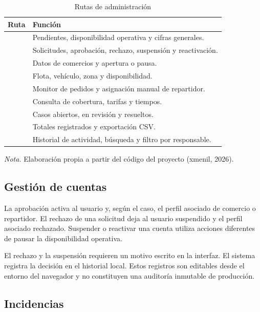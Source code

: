 \documentclass[12pt,letterpaper]{article}
\begin{document}
\begingroup\singlespacing
\begin{longtable}{L{5.2cm}L{10.1cm}}
\caption{Rutas de administración}\\
\toprule
Ruta & Función \\
\midrule
\endhead
{} & Pendientes, disponibilidad operativa y cifras generales. \\
 & Solicitudes, aprobación, rechazo, suspensión y reactivación. \\
 & Datos de comercios y apertura o pausa. \\
 & Flota, vehículo, zona y disponibilidad. \\
 & Monitor de pedidos y asignación manual de repartidor. \\
 & Consulta de cobertura, tarifas y tiempos. \\
 & Casos abiertos, en revisión y resueltos. \\
 & Totales registrados y exportación CSV. \\
 & Historial de actividad, búsqueda y filtro por responsable. \\
\bottomrule
\end{longtable}
\endgroup
\noindent\textit{Nota.} Elaboración propia a partir del código del proyecto (xmenil, 2026).\par\bigskip

\subsection{Gestión de cuentas}

La aprobación activa al usuario y, según el caso, el perfil asociado de comercio o repartidor. El rechazo de una solicitud deja al usuario suspendido y el perfil asociado rechazado. Suspender o reactivar una cuenta utiliza acciones diferentes de pausar la disponibilidad operativa.

El rechazo y la suspensión requieren un motivo escrito en la interfaz. El sistema registra la decisión en el historial local. Estos registros son editables desde el entorno del navegador y no constituyen una auditoría inmutable de producción.

\subsection{Incidencias}
\end{document}
